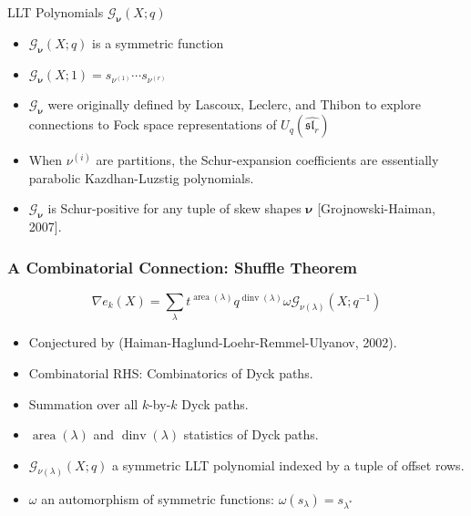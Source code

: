 \documentclass[dvipsnames,handout]{beamer}
\newcommand{\Gcal}{{\mathcal G}}
\newcommand{\nubold}{{\boldsymbol \nu }}
\DeclareMathOperator{\dinv}{dinv}
\DeclareMathOperator{\area}{area}
\renewcommand{\sl}{\mathfrak{sl}}
\theoremstyle{definition}
\newcounter{c}
\begin{document}
\begin{frame}{LLT Polynomials \(\Gcal_\nubold(X;q)\)}
  \begin{itemize}
  \item \(\Gcal_\nubold(X;q)\) is a symmetric function\pause
  \item \(\Gcal_\nubold(X;1) = s_{\nu^{(1)}} \cdots s_{\nu^{(r)}}\)\pause
  \item \(\Gcal_\nubold\) were originally defined by Lascoux, Leclerc, and
    Thibon to explore connections to Fock space representations of \(U_q(\hat{\sl_r})\)\pause
  \item When \(\nu^{(i)}\) are partitions, the Schur-expansion
    coefficients are essentially parabolic Kazdhan-Luzstig polynomials.\pause
  \item \(\Gcal_\nubold\) is Schur-positive for any tuple of skew shapes \(\nubold\)
    [Grojnowski-Haiman, 2007].
  \end{itemize}
\end{frame}
\begin{frame}
  \frametitle{A Combinatorial Connection: Shuffle Theorem}
  \begin{theorem}
    \[
      \nabla e_k(X) = \sum_\lambda t^{\area(\lambda)}q^{\dinv(\lambda)}
      \omega \Gcal_{\nu(\lambda)}(X;q^{-1})
    \]
  \end{theorem}
  \begin{itemize}
  \item Conjectured by (Haiman-Haglund-Loehr-Remmel-Ulyanov, 2002).\pause
  \item Combinatorial RHS: Combinatorics of Dyck paths. \pause
  \item Summation over all \(k\)-by-\(k\) Dyck paths.\pause
  \item \(\area(\lambda)\) and \(\dinv(\lambda)\) statistics of Dyck paths.\pause
  \item \(\Gcal_{\nu(\lambda)}(X;q)\) a symmetric LLT polynomial
    indexed by a tuple of offset rows. \pause
  \item \(\omega\) an automorphism of symmetric functions:
    \(\omega(s_\lambda) = s_{\lambda^*}\)
  \end{itemize}
\end{frame}
\end{document}
